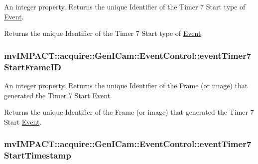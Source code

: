 An integer property. Returns the unique Identifier of the Timer 7 Start type of \hyperlink{classmv_i_m_p_a_c_t_1_1acquire_1_1_event}{Event}. 

Returns the unique Identifier of the Timer 7 Start type of \hyperlink{classmv_i_m_p_a_c_t_1_1acquire_1_1_event}{Event}. \hypertarget{classmv_i_m_p_a_c_t_1_1acquire_1_1_gen_i_cam_1_1_event_control_aa0d1c0cb618e09321370e00f7f9fa8b6}{
\subsubsection[{event\+Timer7\+Start\+Frame\+I\+D}]{ mv\+I\+M\+P\+A\+C\+T\+::acquire\+::\+Gen\+I\+Cam\+::\+Event\+Control\+::event\+Timer7\+Start\+Frame\+I\+D}}\label{classmv_i_m_p_a_c_t_1_1acquire_1_1_gen_i_cam_1_1_event_control_aa0d1c0cb618e09321370e00f7f9fa8b6}


An integer property. Returns the unique Identifier of the Frame (or image) that generated the Timer 7 Start \hyperlink{classmv_i_m_p_a_c_t_1_1acquire_1_1_event}{Event}. 

Returns the unique Identifier of the Frame (or image) that generated the Timer 7 Start \hyperlink{classmv_i_m_p_a_c_t_1_1acquire_1_1_event}{Event}. \hypertarget{classmv_i_m_p_a_c_t_1_1acquire_1_1_gen_i_cam_1_1_event_control_a8137d7df96944dc9aee63a5d3075f77d}{
\subsubsection[{event\+Timer7\+Start\+Timestamp}]{ mv\+I\+M\+P\+A\+C\+T\+::acquire\+::\+Gen\+I\+Cam\+::\+Event\+Control\+::event\+Timer7\+Start\+Timestamp}}\label{classmv_i_m_p_a_c_t_1_1acquire_1_1_gen_i_cam_1_1_event_control_a8137d7df96944dc9aee63a5d3075f77d}


